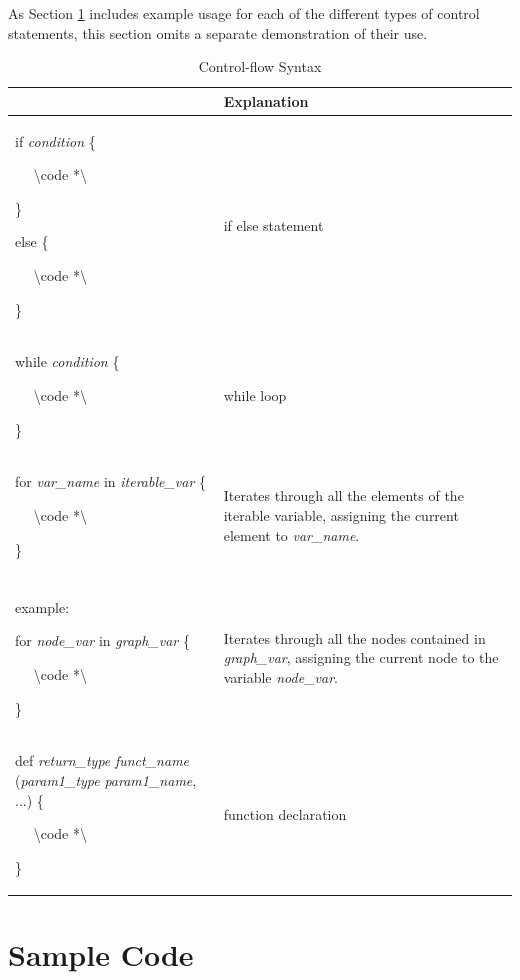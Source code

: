\documentclass{article}
\begin{document}
As Section \ref{sec:code} includes example usage for each of the different types of control statements, this section omits a separate demonstration of their use.

\begin{table}[H]
\centering
\begin{tabular}{| p{3in} | p{2.75in} |}
\hline
& Explanation \\
\hline
if \emph{condition} \{ 

$\quad$ \textbackslash* code *\textbackslash 

\}

else \{

$\quad$ \textbackslash* code *\textbackslash  

\}

& if else statement \\
\hline
while \emph{condition} \{ 

$\quad$ \textbackslash* code *\textbackslash

\} & while loop \\
\hline
for \emph{var\_name} in \emph{iterable\_var} \{

$\quad$ \textbackslash* code *\textbackslash

\} & Iterates through all the elements of the iterable variable, assigning the current element to \emph{var\_name}. \\
&\\
example:

for \emph{node\_var} in \emph{graph\_var} \{

$\quad$ \textbackslash* code *\textbackslash 

\} & Iterates through all the nodes contained in \emph{graph\_var}, assigning the current node to the variable \emph{node\_var}. \\
\hline
def \emph{return\_type} \emph{funct\_name} (\emph{param1\_type} \emph{param1\_name}, ...) \{

$\quad$ \textbackslash* code *\textbackslash

\}

& function declaration \\
\hline
\end{tabular}
\caption{Control-flow Syntax}
\label{tbl:control}
\end{table}

\section{Sample Code}
\label{sec:code}
\end{document}

